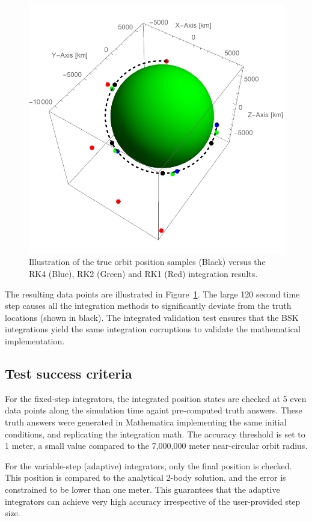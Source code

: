 \begin{figure}[t]
	\centerline{
	\includegraphics[]{Figures/intResults}
	}
	\caption{Illustration of the true orbit position samples (Black) versus the RK4 (Blue), RK2 (Green) and RK1 (Red) integration results.}
	\label{fig:intResults}
\end{figure}
The resulting data points are illustrated in Figure~\ref{fig:intResults}.  The large 120 second time step causes all the integration methods to significantly deviate from the truth locations (shown in black).  The integrated validation test ensures that the BSK integrations yield the same integration corruptions to validate the mathematical implementation.

\subsection{Test success criteria}
For the fixed-step integrators, the integrated position states are checked at 5 even data points along the simulation time againt pre-computed truth answers.  These truth answers were generated in Mathematica implementing the same initial conditions, and replicating the integration math.    The accuracy threshold is set to 1 meter, a small value compared to the 7,000,000 meter near-circular orbit radius.

For the variable-step (adaptive) integrators, only the final position is checked. This position is compared to the analytical 2-body solution, and the error is constrained to be lower than one meter. This guarantees that the adaptive integrators can achieve very high accuracy irrespective of the user-provided step size.

